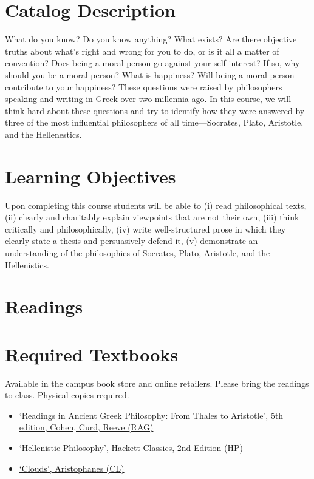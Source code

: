 \documentclass[article,oneside]{memoir}
\begin{document}
\section{Catalog Description}

What do you know? Do you know anything? What exists? Are there objective truths about what’s right and wrong for you to do, or is it all a matter of convention? Does being a moral person go against your self-interest? If so, why should you be a moral person? What is happiness? Will being a moral person contribute to your happiness? These questions were raised by philosophers speaking and writing in Greek over two millennia ago. In this course, we will think hard about these questions and try to identify how they were answered by three of the most influential philosophers of all time---Socrates, Plato, Aristotle, and the Hellenestics. 

\section{Learning Objectives}

Upon completing this course students will be able to (i) read
philosophical texts, (ii) clearly and charitably explain viewpoints that
are not their own, (iii) think critically and philosophically, (iv)
write well-structured prose in which they clearly state a thesis and
persuasively defend it, (v) demonstrate an understanding of the
philosophies of Socrates, Plato, Aristotle, and the Hellenistics.


\section{Readings}
\section{Required Textbooks}

Available in the campus book store and online retailers. Please bring the readings to class. Physical copies required. 
\begin{itemize}
\item \href{https://www.amazon.com/Readings-Ancient-Greek-Philosophy-Aristotle/dp/1624665322/ref=dp_ob_title_bk}{`Readings in Ancient Greek Philosophy: From Thales to Aristotle', 5th edition, Cohen, Curd, Reeve (RAG)}
\item \href{http://www.amazon.com/Hellenistic-Philosophy-Hackett-Classics-Inwood/dp/0872203786/ref=sr_1_1?ie=UTF8&qid=1452099186&sr=8-1&keywords=hellenistic+philosophy}{`Hellenistic Philosophy', Hackett Classics, 2nd Edition (HP)}
\item \href{https://www.amazon.com/Clouds-Aristophanes/dp/0872205169/ref=sr_1_2?s=books&ie=UTF8&qid=1515009741&sr=1-2&keywords=aristophanes+clouds}{`Clouds', Aristophanes (CL)}

\end{itemize}
\end{document}

